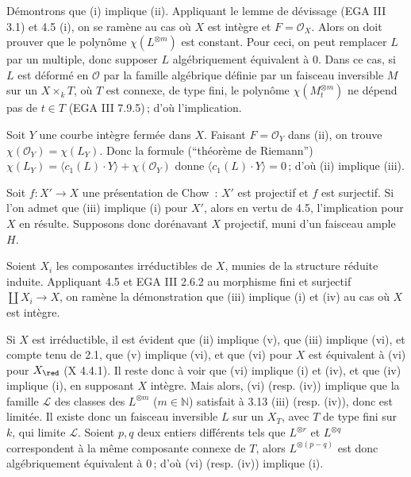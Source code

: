 D\'emontrons que (i) implique (ii). Appliquant le lemme de d\'evissage (EGA III 3.1) et 4.5 (i), on se ram\`ene au cas o\`u \(X\) est int\`egre et \(F=\mathcal O_X\). Alors on doit prouver que le polyn\^ome \(\chi(L^{\otimes m})\) est constant. Pour ceci, on peut remplacer \(L\) par un multiple, donc supposer \(L\) alg\'ebriquement \'equivalent \`a \(0\). Dans ce cas, si \(L\) est d\'eform\'e en \(\mathcal O\) par la famille alg\'ebrique d\'efinie par un faisceau inversible \(M\) sur un \(X\times_kT\), o\`u \(T\) est connexe, de type fini, le polyn\^ome \(\chi(M_t^{\otimes m})\) ne d\'epend pas de \(t\in T\) (EGA III 7.9.5)\,; d'o\`u l'implication.

Soit \(Y\) une courbe int\`egre ferm\'ee dans \(X\). Faisant \(F=\mathcal O_Y\) dans (ii), on trouve \(\chi(\mathcal O_Y)=\chi(L_Y)\). Donc la formule (``th\'eor\`eme de Riemann'') \(\chi(L_Y)=\langle c_1(L)\cdot Y\rangle+\chi(\mathcal O_Y)\) donne \(\langle c_1(L)\cdot Y\rangle=0\)\,; d'o\`u (ii) implique (iii).

Soit \(f:X'\to X\) une pr\'esentation de Chow~: \(X'\) est projectif et \(f\) est surjectif. Si l'on admet que (iii) implique (i) pour \(X'\), alors en
vertu de 4.5, l'implication pour \(X\) en r\'esulte. Supposons donc dor\'enavant \(X\) projectif, muni d'un faisceau ample \(H\).

Soient \(X_i\) les composantes irr\'eductibles de \(X\), munies de la structure r\'eduite induite. Appliquant 4.5 et EGA III 2.6.2 au morphisme fini et surjectif \(\coprod X_i\to X\), on ram\`ene la d\'emonstration que (iii) implique (i) et (iv) au cas o\`u \(X\) est int\`egre.

Si \(X\) est irr\'eductible, il est \'evident que (ii) implique (v), que (iii) implique (vi), et compte tenu de 2.1, que (v) implique (vi), et que (vi) pour \(X\) est \'equivalent \`a (vi) pour \(X_{\red}\) (X 4.4.1). Il reste donc \`a voir que (vi) implique (i) et (iv), et que (iv) implique (i), en supposant \(X\) int\`egre. Mais alors, (vi) (resp. (iv)) implique que la famille \(\mathcal L\) des classes des \(L^{\otimes m}\) (\(m\in\mathbb N\)) satisfait \`a 3.13 (iii) (resp. (iv)), donc est limit\'ee. Il existe donc un faisceau inversible \(L\) sur un \(X_T\), avec \(T\) de type fini sur \(k\), qui limite \(\mathcal L\). Soient \(p,q\) deux entiers diff\'erents tels que \(L^{\otimes r}\) et \(L^{\otimes q}\) correspondent \`a la m\^eme composante connexe de \(T\), alors \(L^{\otimes(p-q)}\) est donc alg\'ebriquement \'equivalent \`a \(0\)\,; d'o\`u (vi) (resp. (iv)) implique (i).


